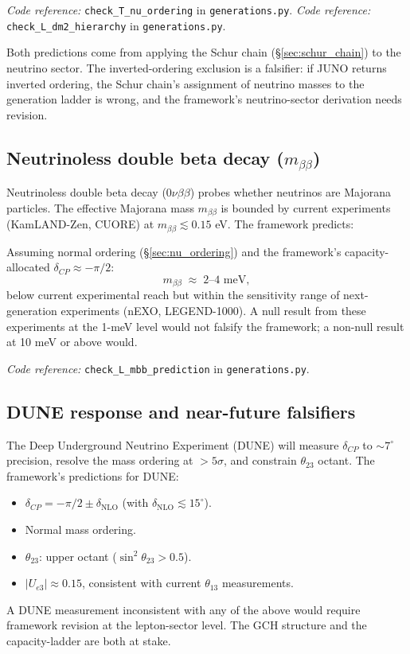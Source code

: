 \documentclass[11pt]{article}
\newcommand{\coderef}[2]{\smallskip\noindent\textit{Code reference:} \texttt{#1} in \texttt{#2}.}
\newcommand{\epitag}[1]{\textbf{[#1]}}
\theoremstyle{definition}
\begin{document}
\coderef{check\_T\_nu\_ordering}{generations.py}
\coderef{check\_L\_dm2\_hierarchy}{generations.py}

Both predictions come from applying the Schur chain (\S\ref{sec:schur_chain}) to the neutrino sector. The inverted-ordering exclusion is a falsifier: if JUNO returns inverted ordering, the Schur chain's assignment of neutrino masses to the generation ladder is wrong, and the framework's neutrino-sector derivation needs revision.

\subsection{Neutrinoless double beta decay (\texorpdfstring{$m_{\beta\beta}$}{mbb})}\label{sec:mbetabeta}

Neutrinoless double beta decay ($0\nu\beta\beta$) probes whether neutrinos are Majorana particles. The effective Majorana mass $m_{\beta\beta}$ is bounded by current experiments (KamLAND-Zen, CUORE) at $m_{\beta\beta} \lesssim 0.15$ eV. The framework predicts:

\begin{tcolorbox}[apfbox, title={$L_{\mathrm{mbb\_prediction}}$ \epitag{P\_structural}+\epitag{Pred}}]
Assuming normal ordering (\S\ref{sec:nu_ordering}) and the framework's capacity-allocated $\delta_{CP} \approx -\pi/2$:
\[
m_{\beta\beta} \;\approx\; 2\text{--}4 \text{ meV},
\]
below current experimental reach but within the sensitivity range of next-generation experiments (nEXO, LEGEND-1000). A null result from these experiments at the 1-meV level would not falsify the framework; a non-null result at 10 meV or above would.
\end{tcolorbox}

\coderef{check\_L\_mbb\_prediction}{generations.py}

\subsection{DUNE response and near-future falsifiers}\label{sec:dune}

The Deep Underground Neutrino Experiment (DUNE) will measure $\delta_{CP}$ to $\sim 7^\circ$ precision, resolve the mass ordering at $>5\sigma$, and constrain $\theta_{23}$ octant. The framework's predictions for DUNE:

\begin{tcolorbox}[apfbox, title={$L_{\mathrm{DUNE\_response}}$ \epitag{Pred}}]
\begin{itemize}
    \item $\delta_{CP} = -\pi/2 \pm \delta_{\mathrm{NLO}}$ (with $\delta_{\mathrm{NLO}} \lesssim 15^\circ$).
    \item Normal mass ordering.
    \item $\theta_{23}$: upper octant ($\sin^2\theta_{23} > 0.5$).
    \item $|U_{e3}| \approx 0.15$, consistent with current $\theta_{13}$ measurements.
\end{itemize}
A DUNE measurement inconsistent with any of the above would require framework revision at the lepton-sector level. The GCH structure and the capacity-ladder are both at stake.
\end{tcolorbox}
\end{document}
